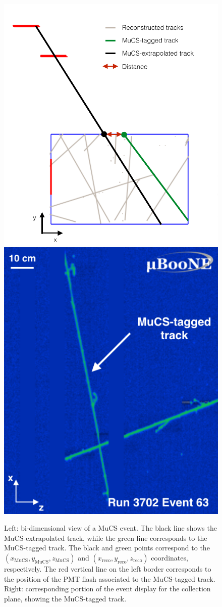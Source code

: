 \documentclass[a4paper,11pt]{article}
\begin{document}
\begin{figure}[htbp]
  \begin{center}
  \includegraphics[width=0.50\linewidth]{figures/evd.pdf}
  \includegraphics[width=0.40\linewidth]{figures/evd_display.png}

  \caption{Left: bi-dimensional view of a MuCS event. The black line shows the MuCS-extrapolated track, while the green line corresponds to the MuCS-tagged track. The black and green points correspond to the $(x_{\mathrm{MuCS}},y_{\mathrm{MuCS}},z_{\mathrm{MuCS}})$ and $(x_{\mathrm{reco}},y_{\mathrm{reco}},z_{\mathrm{reco}})$ coordinates, respectively. The red vertical line on the left border corresponds to the position of the PMT flash associated to the MuCS-tagged track. Right: corresponding portion of the event display for the collection plane, showing the MuCS-tagged track.} \label{fig:evd}
\end{center}
\end{figure}
\end{document}
